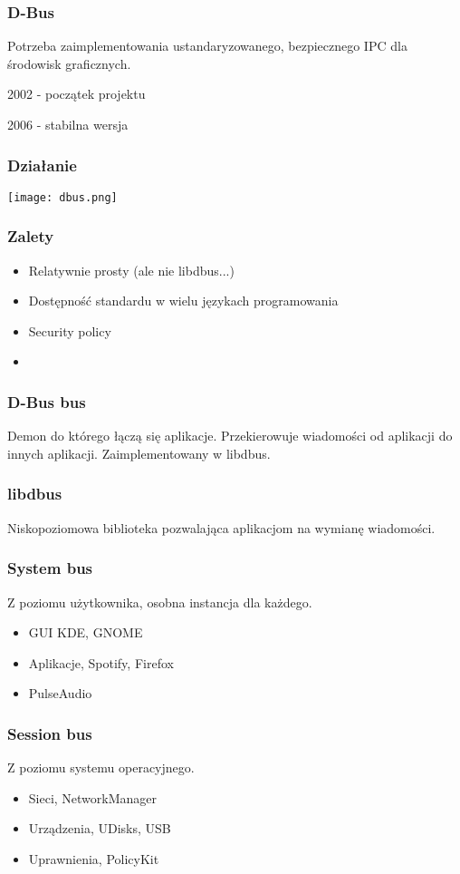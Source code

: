 \begin{frame}
    \frametitle{D-Bus}
    Potrzeba zaimplementowania ustandaryzowanego,
    bezpiecznego IPC dla
    środowisk graficznych.

    2002 - początek projektu

    2006 - stabilna wersja
\end{frame}

\begin{frame}
    \frametitle{Działanie}
    \texttt{[image: dbus.png]}
\end{frame}

\begin{frame}
    \frametitle{Zalety}
    \begin{itemize}
        \item Relatywnie prosty (ale nie libdbus...)
        \item Dostępność standardu w wielu językach programowania
        \item Security policy
        \item 
    \end{itemize}
\end{frame}

\begin{frame}
    \frametitle{D-Bus bus}
    Demon do którego łączą się aplikacje. Przekierowuje
    wiadomości od aplikacji do innych aplikacji. Zaimplementowany
    w libdbus.
\end{frame}

\begin{frame}
    \frametitle{libdbus}
    Niskopoziomowa biblioteka pozwalająca aplikacjom na wymianę 
    wiadomości.
\end{frame}

\begin{frame}
    \frametitle{System bus}
    Z poziomu użytkownika, osobna instancja dla każdego.
    \begin{itemize}
        \item GUI KDE, GNOME
        \item Aplikacje, Spotify, Firefox
        \item PulseAudio
    \end{itemize}
\end{frame}

\begin{frame}
    \frametitle{Session bus}
    Z poziomu systemu operacyjnego.
    \begin{itemize}
        \item Sieci, NetworkManager
        \item Urządzenia, UDisks, USB
        \item Uprawnienia, PolicyKit
    \end{itemize}
\end{frame}

